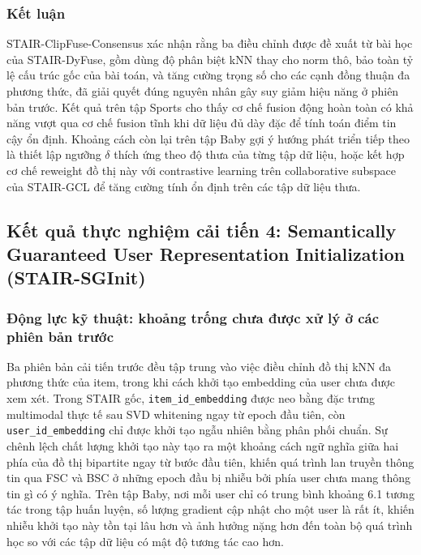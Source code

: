 \begin{longtable}
\subsubsection{Kết luận}
 
STAIR-ClipFuse-Consensus xác nhận rằng ba điều chỉnh được đề xuất từ bài học của STAIR-DyFuse, gồm dùng độ phân biệt kNN thay cho norm thô, bảo toàn tỷ lệ cấu trúc gốc của bài toán, và tăng cường trọng số cho các cạnh đồng thuận đa phương thức, đã giải quyết đúng nguyên nhân gây suy giảm hiệu năng ở phiên bản trước. Kết quả trên tập Sports cho thấy cơ chế fusion động hoàn toàn có khả năng vượt qua cơ chế fusion tĩnh khi dữ liệu đủ dày đặc để tính toán điểm tin cậy ổn định. Khoảng cách còn lại trên tập Baby gợi ý hướng phát triển tiếp theo là thiết lập ngưỡng $\delta$ thích ứng theo độ thưa của từng tập dữ liệu, hoặc kết hợp cơ chế reweight đồ thị này với contrastive learning trên collaborative subspace của STAIR-GCL để tăng cường tính ổn định trên các tập dữ liệu thưa.
 


 
\subsection{Kết quả thực nghiệm cải tiến 4: Semantically Guaranteed User Representation Initialization (STAIR-SGInit)}
 
\subsubsection{Động lực kỹ thuật: khoảng trống chưa được xử lý ở các phiên bản trước}
 
Ba phiên bản cải tiến trước đều tập trung vào việc điều chỉnh đồ thị kNN đa phương thức của item, trong khi cách khởi tạo embedding của user chưa được xem xét. Trong STAIR gốc, \texttt{item\_id\_embedding} được neo bằng đặc trưng multimodal thực tế sau SVD whitening ngay từ epoch đầu tiên, còn \texttt{user\_id\_embedding} chỉ được khởi tạo ngẫu nhiên bằng phân phối chuẩn. Sự chênh lệch chất lượng khởi tạo này tạo ra một khoảng cách ngữ nghĩa giữa hai phía của đồ thị bipartite ngay từ bước đầu tiên, khiến quá trình lan truyền thông tin qua FSC và BSC ở những epoch đầu bị nhiễu bởi phía user chưa mang thông tin gì có ý nghĩa. Trên tập Baby, nơi mỗi user chỉ có trung bình khoảng 6.1 tương tác trong tập huấn luyện, số lượng gradient cập nhật cho một user là rất ít, khiến nhiễu khởi tạo này tồn tại lâu hơn và ảnh hưởng nặng hơn đến toàn bộ quá trình học so với các tập dữ liệu có mật độ tương tác cao hơn.
 

\end{longtable}
